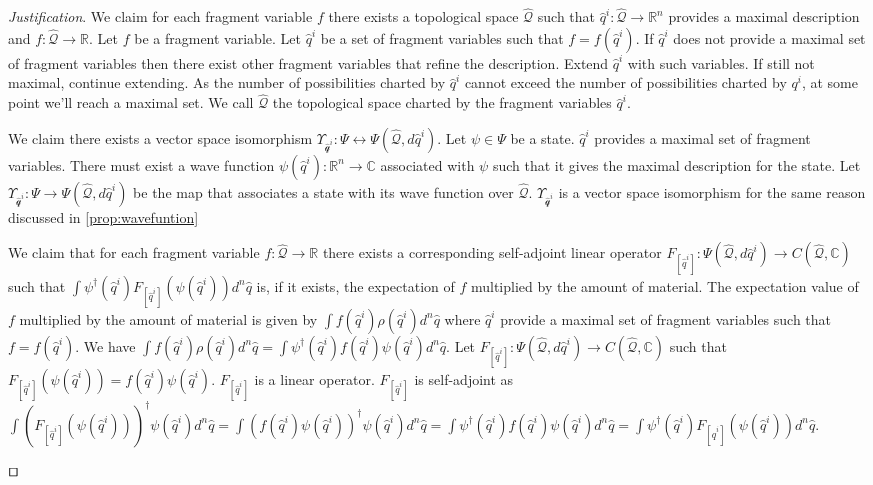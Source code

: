 \documentclass[smallextended]{svjour3}
\numberwithin{equation}{section}
\newenvironment{justification}{\emph{Justification}.}{\hfill\(\qed\)}
\begin{document}
\begin{justification}
	We claim for each fragment variable $f$ there exists a topological space $\hat{\mathcal{Q}}$ such that  $\hat{q}^i : \hat{\mathcal{Q}} \rightarrow \mathbb{R}^n$ provides a maximal description and $f : \hat{\mathcal{Q}} \rightarrow \mathbb{R}$. Let $f$ be a fragment variable. Let $\hat{q}^i$ be a set of fragment variables such that $f=f(\hat{q}^i)$. If $\hat{q}^i$ does not provide a maximal set of fragment variables then there exist other fragment variables that refine the description. Extend $\hat{q}^i$ with such variables. If still not maximal, continue extending. As the number of possibilities charted by $\hat{q}^i$ cannot exceed the number of possibilities charted by $q^i$, at some point we'll reach a maximal set. We call $\hat{\mathcal{Q}}$ the topological space charted by the fragment variables $\hat{q}^i$.
	
	We claim there exists a vector space isomorphism $\Upsilon_{\hat{\mathcal{q}}^i} : \Psi \leftrightarrow \Psi(\hat{\mathcal{Q}}, d\hat{q}^i)$. Let $\psi \in \Psi$ be a state. $\hat{q}^i$ provides a maximal set of fragment variables. There must exist a wave function $\psi(\hat{q}^i) : \mathbb{R}^n \rightarrow \mathbb{C}$ associated with $\psi$ such that it gives the maximal description for the state. Let $\Upsilon_{\hat{\mathcal{q}}^i} : \Psi \rightarrow \Psi(\hat{\mathcal{Q}}, d\hat{q}^i)$ be the map that associates a state with its wave function over $\hat{\mathcal{Q}}$. $\Upsilon_{\hat{\mathcal{q}}^i}$ is a vector space isomorphism for the same reason discussed in \ref{prop:wavefuntion}
	
	We claim that for each fragment variable $f : \hat{\mathcal{Q}} \rightarrow \mathbb{R}$ there exists a corresponding self-adjoint linear operator $F_{[\hat{q}^i]} : \Psi(\hat{\mathcal{Q}}, d\hat{q}^i) \rightarrow C(\hat{\mathcal{Q}}, \mathbb{C})$ such that $\int \psi^\dagger(\hat{q}^i) F_{[\hat{q}^i]}( \psi(\hat{q}^i)) d^n \hat{q}$ is, if it exists, the expectation of $f$ multiplied by the amount of material. The expectation value of $f$ multiplied by the amount of material is given by $\int f(\hat{q}^i) \rho(\hat{q}^i) d^n\hat{q}$ where $\hat{q}^i$ provide a maximal set of fragment variables such that $f=f(\hat{q}^i)$. We have $\int f(\hat{q}^i) \rho(\hat{q}^i) d^n\hat{q} = \int \psi^\dagger(\hat{q}^i) f(\hat{q}^i) \psi(\hat{q}^i) d^{n}\hat{q}$. Let $F_{[\hat{q}^i]} : \Psi(\hat{\mathcal{Q}}, d\hat{q}^i) \rightarrow C(\hat{\mathcal{Q}}, \mathbb{C})$ such that $F_{[\hat{q}^i]} (\psi(\hat{q}^i)) = f(\hat{q}^i) \psi(\hat{q}^i)$. $F_{[\hat{q}^i]}$ is a linear operator. $F_{[\hat{q}^i]}$ is self-adjoint as $\int (F_{[\hat{q}^i]}(\psi(\hat{q}^i)))^\dagger \psi(\hat{q}^i) d^{n}\hat{q} = \int (f(\hat{q}^i) \psi(\hat{q}^i))^\dagger \psi(\hat{q}^i) d^{n}\hat{q} = \int \psi^\dagger(\hat{q}^i) f(\hat{q}^i) \psi(\hat{q}^i) d^{n}\hat{q} = \int \psi^\dagger(\hat{q}^i) F_{[\hat{q}^i]} (\psi(\hat{q}^i)) d^{n}\hat{q}$.
		

\end{justification}
\end{document}
